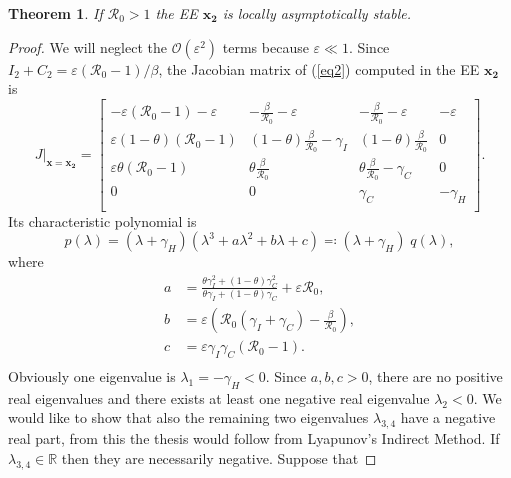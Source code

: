 \documentclass[11pt,reqno]{amsart}
\newtheorem{theorem}{Theorem}
\theoremstyle{boldremark}
\begin{document}
\begin{theorem}
    If $\mathcal{R}_0>1$ the EE $\mathbf{x_2}$ is locally asymptotically stable. 
\end{theorem}
\begin{proof}
    We will neglect the $\mathcal{O}(\varepsilon^2)$ terms because $\varepsilon \ll 1$. Since $I_2+C_2 = \varepsilon (\mathcal{R}_0-1)/\beta$, the Jacobian matrix of (\ref{eq2}) computed in the EE $\mathbf{x_2}$ is 
    \begin{equation*}
        J|_{\mathbf{x}=\mathbf{x_2}} = 
        \begin{bmatrix}
            -\varepsilon(\mathcal{R}_0-1)-\varepsilon & -\frac{\beta}{\mathcal{R}_0}-\varepsilon & -\frac{\beta}{\mathcal{R}_0}-\varepsilon & -\varepsilon \\ 
            \varepsilon(1-\theta)(\mathcal{R}_0-1) & (1-\theta) \frac{\beta}{\mathcal{R}_0}-\gamma_I & (1-\theta) \frac{\beta}{\mathcal{R}_0} & 0 \\ 
            \varepsilon\theta(\mathcal{R}_0-1) & \theta \frac{\beta}{\mathcal{R}_0} & \theta \frac{\beta}{\mathcal{R}_0}-\gamma_C & 0 \\ 
            0 & 0 & \gamma_C & -\gamma_H \\ 
        \end{bmatrix}. 
    \end{equation*}
    Its characteristic polynomial is 
    \begin{equation*}
        p(\lambda)=(\lambda+\gamma_H) (\lambda^3+a\lambda^2+b\lambda+c) \eqqcolon (\lambda+\gamma_H) \; q(\lambda), 
    \end{equation*}
    where 
    \begin{equation*}
    \begin{split}
        a&=\frac{\theta \gamma_I^2 + (1-\theta)\gamma_C^2}{\theta \gamma_I + (1-\theta)\gamma_C} + \varepsilon \mathcal{R}_0, \\ 
        b&=\varepsilon \left( \mathcal{R}_0 (\gamma_I+\gamma_C) - \frac{\beta}{\mathcal{R}_0} \right), \\ 
        c&=\varepsilon \gamma_I \gamma_C (\mathcal{R}_0 - 1).  \\ 
    \end{split}
    \end{equation*}
    Obviously one eigenvalue is $\lambda_1=-\gamma_H < 0$. Since $a,b,c>0$, there are no positive real eigenvalues and there exists at least one negative real eigenvalue $\lambda_2<0$. We would like to show that also the remaining two eigenvalues $\lambda_{3,4}$ have a negative real part, from this the thesis would follow from Lyapunov's Indirect Method. If $\lambda_{3,4} \in \mathbb{R}$ then they are necessarily negative. Suppose that 

\end{proof}
\end{document}
